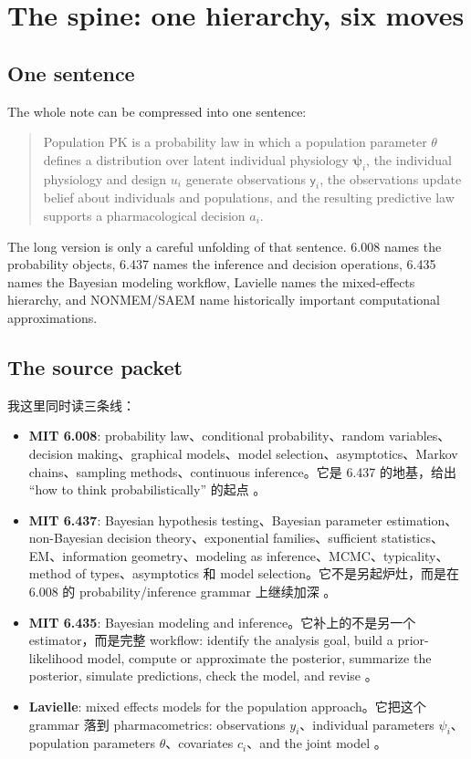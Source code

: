 \documentclass[a4paper]{article}
\newcommand{\rv}[1]{\mathsf{#1}}
\newcommand{\rpsi}{\boldsymbol{\psi}}
\begin{document}
\section{The spine: one hierarchy, six moves}

\subsection{One sentence}

The whole note can be compressed into one sentence:
\begin{quote}
  Population PK is a probability law in which a population parameter \(\theta\) defines a distribution over latent individual physiology \(\rpsi_i\), the individual physiology and design \(u_i\) generate observations \(\rv{y}_i\), the observations update belief about individuals and populations, and the resulting predictive law supports a pharmacological decision \(a_i\).
\end{quote}

  The long version is only a careful unfolding of that sentence.  6.008 names the probability objects, 6.437 names the inference and decision operations, 6.435 names the Bayesian modeling workflow, Lavielle names the mixed-effects hierarchy, and NONMEM/SAEM name historically important computational approximations.

\subsection{The source packet}

我这里同时读三条线：

\begin{itemize}[leftmargin=2em]
  \item \textbf{MIT 6.008}: probability law、conditional probability、random variables、decision making、graphical models、model selection、asymptotics、Markov chains、sampling methods、continuous inference。它是 6.437 的地基，给出 ``how to think probabilistically'' 的起点 \cite{mit6008notes}。
  \item \textbf{MIT 6.437}: Bayesian hypothesis testing、Bayesian parameter estimation、non-Bayesian decision theory、exponential families、sufficient statistics、EM、information geometry、modeling as inference、MCMC、typicality、method of types、asymptotics 和 model selection。它不是另起炉灶，而是在 6.008 的 probability/inference grammar 上继续加深 \cite{mit6437notes}。
  \item \textbf{MIT 6.435}: Bayesian modeling and inference。它补上的不是另一个 estimator，而是完整 workflow: identify the analysis goal, build a prior-likelihood model, compute or approximate the posterior, summarize the posterior, simulate predictions, check the model, and revise \cite{mit6435notes}。
  \item \textbf{Lavielle}: mixed effects models for the population approach。它把这个 grammar 落到 pharmacometrics: observations \(y_i\)、individual parameters \(\psi_i\)、population parameters \(\theta\)、covariates \(c_i\)、and the joint model \cite{lavielle2015mixed}。
\end{itemize}
\end{document}
